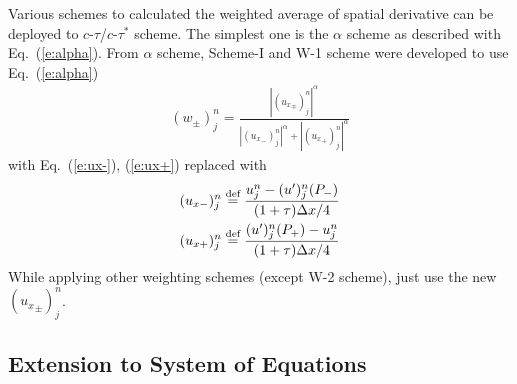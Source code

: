 \documentclass{turgon}
\begin{document}
Various schemes to calculated the weighted average of spatial derivative can be
deployed to $c$-$\tau$/$c$-$\tau^*$ scheme.  The simplest one is the $\alpha$
scheme as described with Eq.~(\ref{e:alpha}).  From $\alpha$ scheme,
Scheme-I \citep{chang_courant_2002} and W-1 scheme
\citep{chang_multi-dimensional_2003} were developed to use Eq.~(\ref{e:alpha})
\begin{align*}
  (w_{\pm})_j^n =
    \frac{|({u_x}_{\mp})_j^n|^{\alpha}}
         {|({u_x}_-)_j^n|^{\alpha}+|({u_x}_+)_j^n|^{\alpha}}
\end{align*}
with Eq.~(\ref{e:ux-}), (\ref{e:ux+}) replaced with
\begin{align}
  (u_{x-})_j^n &\defeq
    \frac{u_j^n - (u')_j^n(P_-)}{(1+\tau)\Delta x/4}
  \label{e:uxp-} \\
  (u_{x+})_j^n &\defeq
    \frac{(u')_j^n(P_+) - u_j^n}{(1+\tau)\Delta x/4}
  \label{e:uxp+}
\end{align}
While applying other weighting schemes (except W-2 scheme), just use the new
$({u_{x}}_{\pm})_j^n$.

\subsection{Extension to System of Equations}
\end{document}
